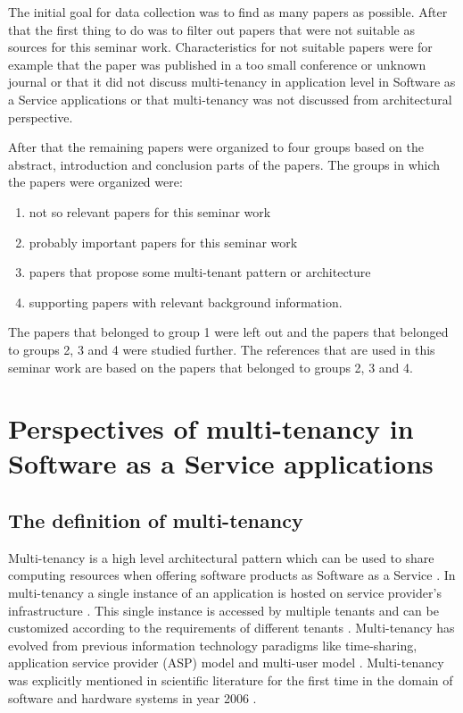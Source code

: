 \documentclass[conference]{sasmoota2017}
\begin{document}
The initial goal for data collection was to find as many papers as possible. After that the first thing to do was to filter out papers that were not suitable as sources for this seminar work. Characteristics for not suitable papers were for example that the paper was published in a too small conference or unknown journal or that it did not discuss multi-tenancy in application level in Software as a Service applications or that multi-tenancy was not discussed from architectural perspective. 

After that the remaining papers were organized to four groups based on the abstract, introduction and conclusion parts of the papers. The groups in which the papers were organized were: 
\begin{enumerate}
\item not so relevant papers for this seminar work
\item probably important papers for this seminar work
\item papers that propose some multi-tenant pattern or architecture
\item supporting papers with relevant background information.
\end{enumerate}
The papers that belonged to group 1 were left out and the papers that belonged to groups 2, 3 and 4 were studied further. The references that are used in this seminar work are based on the papers that belonged to groups 2, 3 and 4. 


\section{Perspectives of multi-tenancy in Software as a Service applications}

\subsection{The definition of multi-tenancy}


Multi-tenancy is a high level architectural pattern which can be used to share computing resources when offering software products as Software as a Service \cite{Kabbedijk2015:Defining}. In multi-tenancy a single instance of an application is hosted on service provider’s infrastructure \cite{Kabbedijk2015:Defining}. This single instance is accessed by multiple tenants and can be customized according to the requirements of different tenants \cite{Kabbedijk2015:Defining}. Multi-tenancy has evolved from previous information technology paradigms like time-sharing, application service provider (ASP) model and multi-user model \cite{Kabbedijk2015:Defining}. Multi-tenancy was explicitly mentioned in scientific literature for the first time in the domain of software and hardware systems in year 2006 \cite{Kabbedijk2015:Defining}. 
\end{document}

